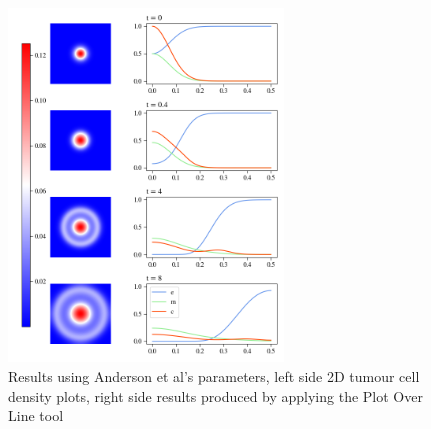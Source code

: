 \begin{figure}
    \centering
    \includegraphics[width=0.65\textwidth]{resources/images/first_replication_results.png}
    \caption{Results using Anderson et al's parameters, left side 2D tumour cell density plots, right side results produced by applying the Plot Over Line tool}
    \label{fig:unadjsuted_replication}
\end{figure}

